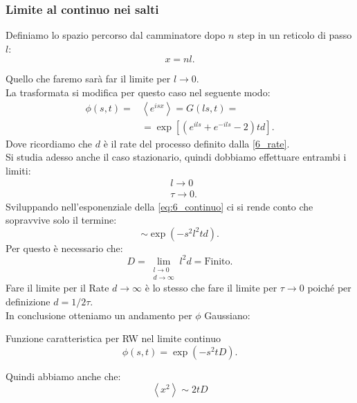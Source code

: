 \subsubsection{Limite al continuo nei salti}%
\label{subsub:Limite al continuo}
Definiamo lo spazio percorso dal camminatore dopo $n$ step in un reticolo di passo $l$:
\[
    x = nl
.\] 

Quello che faremo sarà far il limite per $l\to 0$.\\
La trasformata si modifica per questo caso nel seguente modo:
\begin{equation}
\begin{aligned}
    \phi (s,t) = &\left<e^{isx}\right> = G(ls, t) =\\
		 & = \exp \left[\left(e^{ils} + e^{-ils} -2 \right)td\right]
		 \label{eq:6_continuo}
.\end{aligned}
\end{equation}
Dove ricordiamo che $d$ è il rate del processo definito dalla \ref{6_rate}.\\
Si studia adesso anche il caso stazionario, quindi dobbiamo effettuare entrambi i limiti:
\[\begin{aligned}
    &l\to 0\\
    &\tau\to 0
.\end{aligned}\]
Sviluppando nell'esponenziale della \ref{eq:6_continuo} ci si rende conto che sopravvive solo il termine:
\[
    \sim \exp\left(-s^2l^2td\right)
.\] 
Per questo è necessario che:
\[
    D = \lim \limits_{\substack{%
	         l \to 0\\
		  d \to \infty}} l^2d = \text{Finito}
.\] 
Fare il limite per il Rate $d\to \infty$ è lo stesso che fare il limite per $\tau\to 0$ poiché per definizione $d = 1 /2\tau$.\\
In conclusione otteniamo un andamento per $\phi$ Gaussiano:
\begin{bluebox}{Funzione caratteristica per RW nel limite continuo}
\[
    \phi (s,t) = \exp\left(-s^2tD\right)
.\]     
\end{bluebox}
\noindent
Quindi abbiamo anche che:
\begin{equation}
    \left<x^2\right> \sim  2tD \label{eq:6_mom_sec}
\end{equation}
